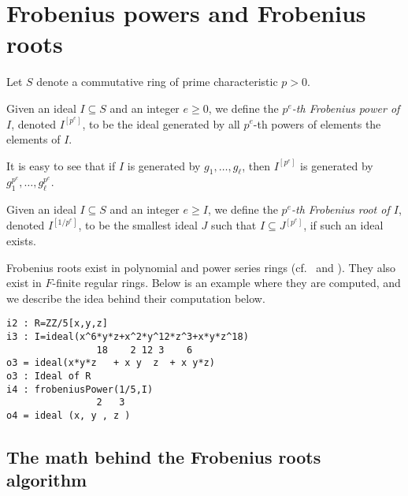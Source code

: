\documentclass[11pt]{amsart}
\begin{document}
\section{Frobenius powers and Frobenius roots}\label{Section: Frobenius powers and Frobenius roots}

Let $S$ denote a commutative ring of prime characteristic $p>0$.

\begin{definition}
Given an ideal $I\subseteq S$ and an integer $e\geq 0$, we define the \emph{$p^e$-th Frobenius power of $I$}, denoted $I^{[p^e]}$, to be the ideal
generated by all $p^e$-th powers of elements the elements of $I$.
\end{definition}

It is easy to see that if $I$ is generated by $g_1, \dots, g_\ell$, then $I^{[p^e]}$ is generated by $g_1^{p^e}, \dots, g_\ell^{p^e}$.


\begin{definition}
Given an ideal $I\subseteq S$ and an integer $e\geq I$, we define the \emph{$p^e$-th Frobenius root of $I$}, denoted $I^{[1/p^{e}]}$, to be the smallest ideal $J$ such that $I\subseteq J^{[p^e]}$, if such an ideal exists.
\end{definition}

Frobenius roots exist in polynomial and power series rings
(cf.~\cite[\S 2]{BlickleMustataSmithDiscretenessAndRationalityOfFThresholds} and \cite[\S 5]{KatzmanParameterTestIdealOfCMRings}).  They also exist in $F$-finite regular rings.  Below is an example where they are computed, and we describe the idea behind their computation below.%


\begin{verbatim}
i2 : R=ZZ/5[x,y,z]
i3 : I=ideal(x^6*y*z+x^2*y^12*z^3+x*y*z^18)
                18    2 12 3    6
o3 = ideal(x*y*z   + x y  z  + x y*z)
o3 : Ideal of R
i4 : frobeniusPower(1/5,I)
                2   3
o4 = ideal (x, y , z )
\end{verbatim}


\subsection{The math behind the Frobenius roots algorithm}
\end{document}
